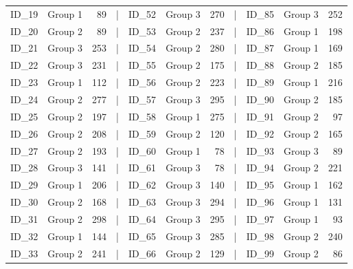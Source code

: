 \documentclass[smallextended]{svjour3}       %
\begin{document}
\begin{table}
\begin{tabular}[t]{llrlllrlllr}
ID\_19 & Group 1 & 89 & | & ID\_52 & Group 3 & 270 & | & ID\_85 & Group 3 & 252\\
ID\_20 & Group 2 & 89 & | & ID\_53 & Group 2 & 237 & | & ID\_86 & Group 1 & 198\\
\addlinespace
ID\_21 & Group 3 & 253 & | & ID\_54 & Group 2 & 280 & | & ID\_87 & Group 1 & 169\\
ID\_22 & Group 3 & 231 & | & ID\_55 & Group 2 & 175 & | & ID\_88 & Group 2 & 185\\
ID\_23 & Group 1 & 112 & | & ID\_56 & Group 2 & 223 & | & ID\_89 & Group 1 & 216\\
ID\_24 & Group 2 & 277 & | & ID\_57 & Group 3 & 295 & | & ID\_90 & Group 2 & 185\\
ID\_25 & Group 2 & 197 & | & ID\_58 & Group 1 & 275 & | & ID\_91 & Group 2 & 97\\
\addlinespace
ID\_26 & Group 2 & 208 & | & ID\_59 & Group 2 & 120 & | & ID\_92 & Group 2 & 165\\
ID\_27 & Group 2 & 193 & | & ID\_60 & Group 1 & 78 & | & ID\_93 & Group 3 & 89\\
ID\_28 & Group 3 & 141 & | & ID\_61 & Group 3 & 78 & | & ID\_94 & Group 2 & 221\\
ID\_29 & Group 1 & 206 & | & ID\_62 & Group 3 & 140 & | & ID\_95 & Group 1 & 162\\
ID\_30 & Group 2 & 168 & | & ID\_63 & Group 3 & 294 & | & ID\_96 & Group 1 & 131\\
\addlinespace
ID\_31 & Group 2 & 298 & | & ID\_64 & Group 3 & 295 & | & ID\_97 & Group 1 & 93\\
ID\_32 & Group 1 & 144 & | & ID\_65 & Group 3 & 285 & | & ID\_98 & Group 2 & 240\\
ID\_33 & Group 2 & 241 & | & ID\_66 & Group 2 & 129 & | & ID\_99 & Group 2 & 86\\
\bottomrule
\end{tabular}
\end{table}
\end{document}
